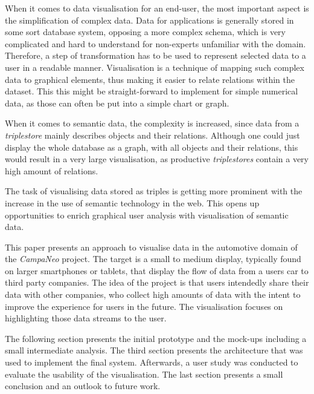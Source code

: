 
  When it comes to data visualisation for an end-user, the most important aspect is the simplification of complex data. Data for applications is generally stored in some sort database system, opposing a more complex schema, which is very complicated and hard to understand for non-experts unfamiliar with the domain. Therefore, a step of transformation has to be used to represent selected data to a user in a readable manner. Visualisation is a technique of mapping such complex data to graphical elements, thus making it easier to relate relations within the dataset. This this might be straight-forward to implement for simple numerical data, as those can often be put into a simple chart or graph.

  When it comes to semantic data, the complexity is increased, since data from a \textit{triplestore} mainly describes objects and their relations. Although one could just display the whole database as a graph, with all objects and their relations, this would result in a very large visualisation, as productive \textit{triplestores} contain a very high amount of relations.

  The task of visualising data stored as triples is getting more prominent with the increase in the use of semantic technology in the web. This opens up opportunities to enrich graphical user analysis with visualisation of semantic data.
  
  This paper presents an approach to visualise data in the automotive domain of the \textit{CampaNeo} project. The target is a small to medium display, typically found on larger smartphones or tablets, that display the flow of data from a users car to third party companies. The idea of the project is that users intendedly share their data with other companies, who collect high amounts of data with the intent to improve the experience for users in the future. The visualisation focuses on highlighting those data streams to the user.
  
  The following section presents the initial prototype and the mock-ups including a small intermediate analysis. The third section presents the architecture that was used to implement the final system. Afterwards, a user study was conducted to evaluate the usability of the visualisation. The last section presents a small conclusion and an outlook to future work.
